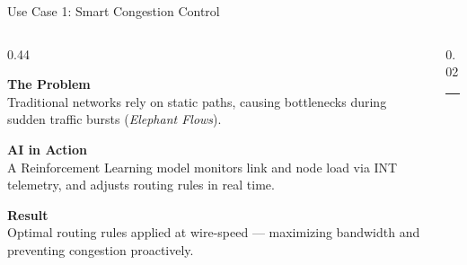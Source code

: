 {
\begin{frame}{Use Case 1: Smart Congestion Control}
\vspace{6pt}

  \begin{columns}[T, totalwidth=\textwidth]

    \begin{column}{0.44\textwidth}

      \begin{tcolorbox}[problemcard=problemred]
        {\color{problemred}\bfseries\scriptsize The Problem}\\[2pt]
        {\footnotesize\color{HUAdark}
          Traditional networks rely on static paths,
          causing bottlenecks during sudden traffic
          bursts (\textit{Elephant Flows}).}
      \end{tcolorbox}

      \vspace{4pt}

      \begin{tcolorbox}[problemcard=HUAblue]
        {\color{HUAblue}\bfseries\scriptsize AI in Action}\\[2pt]
        {\footnotesize\color{HUAdark}
          A Reinforcement Learning model monitors
          link and node load via INT telemetry,
          and adjusts routing rules in real time.}
      \end{tcolorbox}

      \vspace{4pt}

      \begin{tcolorbox}[problemcard=solutiongreen]
        {\color{solutiongreen}\bfseries\scriptsize Result}\\[2pt]
        {\footnotesize\color{HUAdark}
          Optimal routing rules applied at wire-speed ---
          maximizing bandwidth and preventing
          congestion proactively.}
      \end{tcolorbox}

    \end{column}

    \begin{column}{0.02\textwidth}
      \centering
      \textcolor{HUAlight}{\rule{0.5pt}{0.80\textheight}}
    \end{column}


\end{columns}
\end{frame}}
